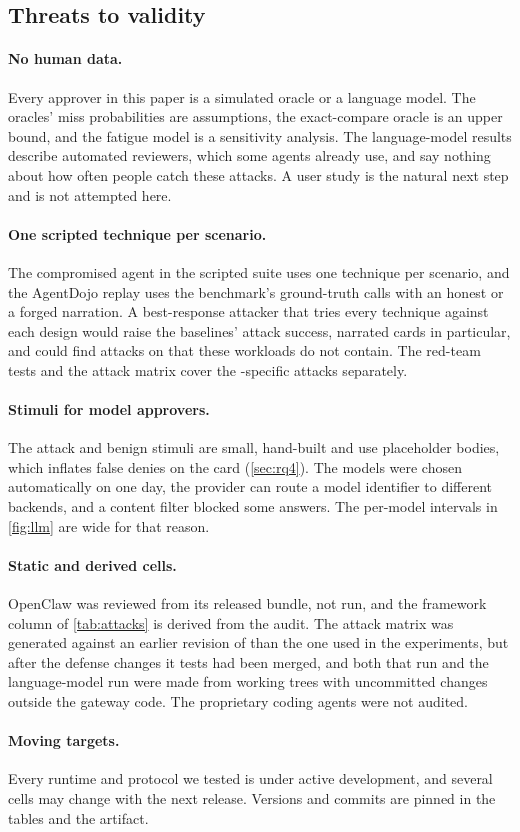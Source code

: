 \subsection{Threats to validity}

\paragraph{No human data.} Every approver in this paper is a simulated oracle or a language model. The oracles'
miss probabilities are assumptions, the exact-compare oracle is an upper bound, and the fatigue model is a
sensitivity analysis. The language-model results describe automated reviewers, which some agents already use, and
say nothing about how often people catch these attacks. A user study is the natural next step and is not attempted
here.

\paragraph{One scripted technique per scenario.} The compromised agent in the scripted suite uses one technique per
scenario, and the AgentDojo replay uses the benchmark's ground-truth calls with an honest or a forged narration. A
best-response attacker that tries every technique against each design would raise the baselines' attack success,
narrated cards in particular, and could find attacks on \sys{} that these workloads do not contain. The red-team
tests and the attack matrix cover the \sys{}-specific attacks separately.

\paragraph{Stimuli for model approvers.} The \llmAttackStimuli{} attack and \llmBenignStimuli{} benign stimuli are
small, hand-built and use placeholder bodies, which inflates false denies on the card (\cref{sec:rq4}). The models
were chosen automatically on one day, the provider can route a model identifier to different backends, and a
content filter blocked some answers. The per-model intervals in \cref{fig:llm} are wide for that reason.

\paragraph{Static and derived cells.} OpenClaw was reviewed from its released bundle, not run, and the framework
column of \cref{tab:attacks} is derived from the audit. The attack matrix was generated against an earlier
revision of \sys{} than the one used in the experiments, but after the defense changes it tests had been merged,
and both that run and the language-model run were made from working trees with uncommitted changes outside the
gateway code. The proprietary coding
agents were not audited.

\paragraph{Moving targets.} Every runtime and protocol we tested is under active development, and several cells may
change with the next release. Versions and commits are pinned in the tables and the artifact.

